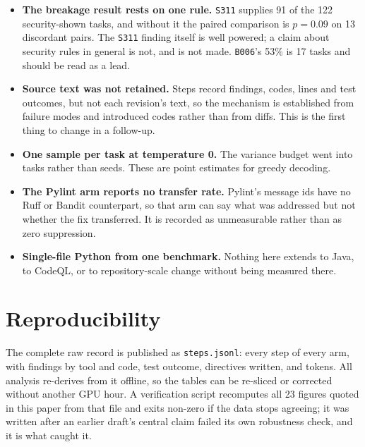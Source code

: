 \documentclass[11pt]{article}
\newcommand{\code}[1]{\texttt{\small #1}}
\begin{document}
\begin{itemize}[leftmargin=1.2em, itemsep=0.35em, topsep=0.4em]
\item \textbf{The breakage result rests on one rule.} \code{S311} supplies 91 of
the 122 security-shown tasks, and without it the paired comparison is $p = 0.09$
on 13 discordant pairs. The \code{S311} finding itself is well powered; a claim
about security rules in general is not, and is not made. \code{B006}'s 53\% is 17
tasks and should be read as a lead.

\item \textbf{Source text was not retained.} Steps record findings, codes, lines
and test outcomes, but not each revision's text, so the mechanism is established
from failure modes and introduced codes rather than from diffs. This is the first
thing to change in a follow-up.

\item \textbf{One sample per task at temperature 0.} The variance budget went into
tasks rather than seeds. These are point estimates for greedy decoding.

\item \textbf{The Pylint arm reports no transfer rate.} Pylint's message ids have
no Ruff or Bandit counterpart, so that arm can say what was addressed but not
whether the fix transferred. It is recorded as unmeasurable rather than as zero
suppression.

\item \textbf{Single-file Python from one benchmark.} Nothing here extends to
Java, to CodeQL, or to repository-scale change without being measured there.
\end{itemize}

\section{Reproducibility}

The complete raw record is published as \code{steps.jsonl}: every step of every
arm, with findings by tool and code, test outcome, directives written, and tokens.
All analysis re-derives from it offline, so the tables can be re-sliced or
corrected without another GPU hour. A verification script recomputes all 23 figures
quoted in this paper from that file and exits non-zero if the data stops agreeing;
it was written after an earlier draft's central claim failed its own robustness
check, and it is what caught it.
\end{document}
